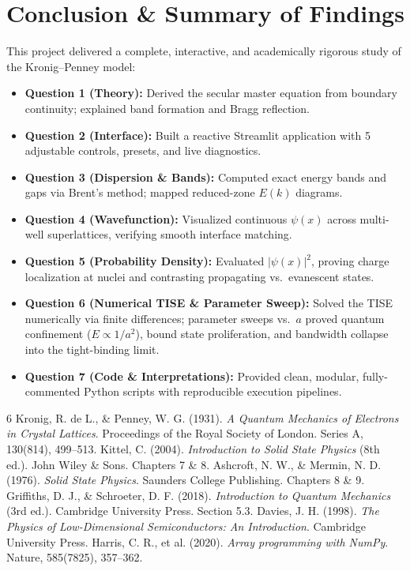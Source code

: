 \documentclass[10pt, a4paper]{article}
\begin{document}
\section{Conclusion \& Summary of Findings}
This project delivered a complete, interactive, and academically rigorous study of the Kronig--Penney model:
\begin{itemize}\setlength{\itemsep}{0pt}\setlength{\parskip}{0.5pt}
    \item \textbf{Question 1 (Theory):} Derived the secular master equation from boundary continuity; explained band formation and Bragg reflection.
    \item \textbf{Question 2 (Interface):} Built a reactive Streamlit application with 5 adjustable controls, presets, and live diagnostics.
    \item \textbf{Question 3 (Dispersion \& Bands):} Computed exact energy bands and gaps via Brent's method; mapped reduced-zone $E(k)$ diagrams.
    \item \textbf{Question 4 (Wavefunction):} Visualized continuous $\psi(x)$ across multi-well superlattices, verifying smooth interface matching.
    \item \textbf{Question 5 (Probability Density):} Evaluated $|\psi(x)|^2$, proving charge localization at nuclei and contrasting propagating vs.\ evanescent states.
    \item \textbf{Question 6 (Numerical TISE \& Parameter Sweep):} Solved the TISE numerically via finite differences; parameter sweeps vs.\ $a$ proved quantum confinement ($E \propto 1/a^2$), bound state proliferation, and bandwidth collapse into the tight-binding limit.
    \item \textbf{Question 7 (Code \& Interpretations):} Provided clean, modular, fully-commented Python scripts with reproducible execution pipelines.
\end{itemize}

\begin{thebibliography}{6}
 Kronig, R. de L., \& Penney, W. G. (1931). \textit{A Quantum Mechanics of Electrons in Crystal Lattices}. Proceedings of the Royal Society of London. Series A, 130(814), 499--513.
 Kittel, C. (2004). \textit{Introduction to Solid State Physics} (8th ed.). John Wiley \& Sons. Chapters 7 \& 8.
 Ashcroft, N. W., \& Mermin, N. D. (1976). \textit{Solid State Physics}. Saunders College Publishing. Chapters 8 \& 9.
 Griffiths, D. J., \& Schroeter, D. F. (2018). \textit{Introduction to Quantum Mechanics} (3rd ed.). Cambridge University Press. Section 5.3.
 Davies, J. H. (1998). \textit{The Physics of Low-Dimensional Semiconductors: An Introduction}. Cambridge University Press.
 Harris, C. R., et al. (2020). \textit{Array programming with NumPy}. Nature, 585(7825), 357--362.
\end{thebibliography}
\end{document}

